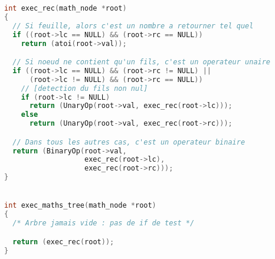 \documentclass[11pt,a4paper]{article}
\begin{document}
\begin{lstlisting}[language=C]
int exec_rec(math_node *root)
{
  // Si feuille, alors c'est un nombre a retourner tel quel
  if ((root->lc == NULL) && (root->rc == NULL))
    return (atoi(root->val));

  // Si noeud ne contient qu'un fils, c'est un operateur unaire
  if ((root->lc == NULL) && (root->rc != NULL) ||
      (root->lc != NULL) && (root->rc == NULL))
    // [detection du fils non nul]
    if (root->lc != NULL)
      return (UnaryOp(root->val, exec_rec(root->lc)));
    else
      return (UnaryOp(root->val, exec_rec(root->rc)));

  // Dans tous les autres cas, c'est un operateur binaire
  return (BinaryOp(root->val,
                   exec_rec(root->lc),
                   exec_rec(root->rc)));
}


int exec_maths_tree(math_node *root)
{
  /* Arbre jamais vide : pas de if de test */

  return (exec_rec(root));
}



\end{lstlisting}



%
%
%
%
%
%
%
\end{document}
